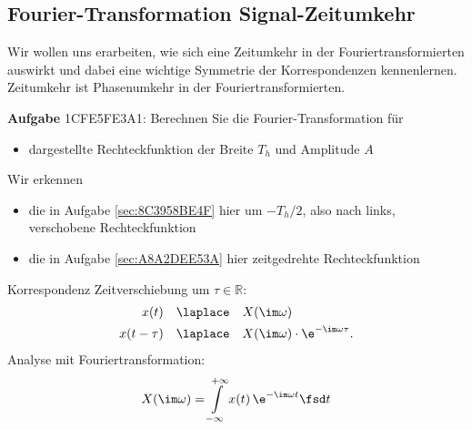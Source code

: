 \clearpage
\subsection{Fourier-Transformation Signal-Zeitumkehr}
\label{sec:1CFE5FE3A1}
\begin{Ziel}
Wir wollen uns erarbeiten, wie sich eine Zeitumkehr in der Fouriertransformierten
auswirkt und dabei eine wichtige Symmetrie der Korrespondenzen kennenlernen.
Zeitumkehr ist Phasenumkehr in der Fouriertransformierten.
\end{Ziel}

\textbf{Aufgabe} {\tiny 1CFE5FE3A1}: Berechnen Sie die Fourier-Transformation für
\begin{itemize}
\item dargestellte Rechteckfunktion der Breite $T_h$ und Amplitude $A$
\end{itemize}
%
\begin{figure}[h!]
\centering
{}
\end{figure}
%
Wir erkennen
\begin{itemize}
\item die in Aufgabe \ref{sec:8C3958BE4F} hier um $-T_h/2$, also nach links,
verschobene Rechteckfunktion
\item die in Aufgabe \ref{sec:A8A2DEE53A} hier zeitgedrehte Rechteckfunktion
\end{itemize}

\begin{Werkzeug}
Korrespondenz Zeitverschiebung um $\tau\in\mathbb{R}$:
\begin{align}
x(t) & \quad \laplace \quad X(\im\omega)\\
x(t - \tau) & \quad \laplace \quad X(\im\omega) \cdot \e^{-\im\omega \tau}.
\end{align}
Analyse mit Fouriertransformation:
\begin{align}
X(\im \omega) = \int\limits_{-\infty}^{+\infty} x(t) \, \e^{-\im \omega t} \fsd t
\end{align}
\end{Werkzeug}

